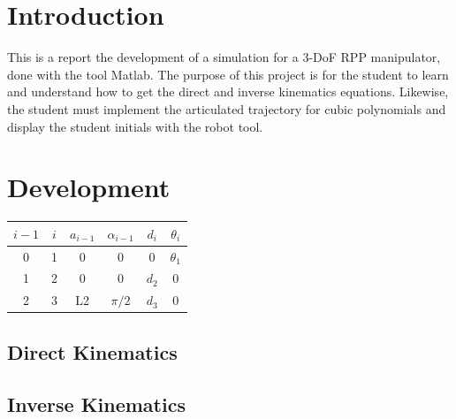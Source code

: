 \documentclass[12pt]{article}
\begin{document}
    \section{Introduction}
    This is a report the development of a simulation for a 3-DoF RPP manipulator, done with the tool Matlab.
    The purpose of this project is for the student to learn and understand how to get the direct and inverse kinematics equations.
    Likewise, the student must implement the articulated trajectory for cubic polynomials and display the student initials with the robot tool.
    
    \section{Development}
    \begin{table}[h]
        \begin{center}
            \begin{tabular}{c c c c c c}
                \hline
                $i-1$ & $i$ & $a_{i-1}$ & $\alpha_{i-1}$ & $d_i$ & $\theta_i$\\
                \hline
                0 & 1 & 0 & 0 & 0 & $\theta_1$\\
                1 & 2 & 0 & 0 & $d_2$ & 0\\
                2 & 3 & L2 & $\pi / 2$ & $d_3$ & 0\\
                \hline
            \end{tabular}
        \end{center}
        \label{table:DH_table}
    \end{table}
        \subsection{Direct Kinematics}
        \subsection{Inverse Kinematics}
\end{document}
